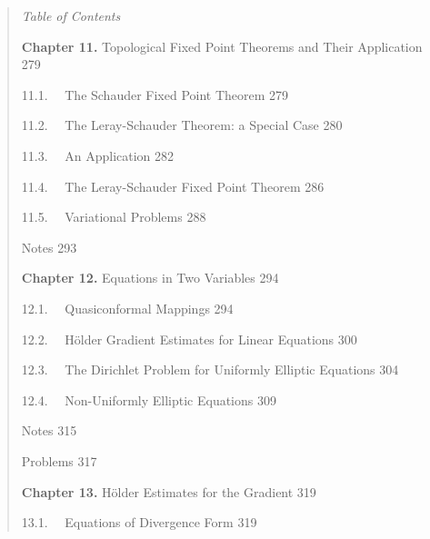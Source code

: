 \begin{quote}
\hfill \textit{Table of Contents}

\vspace{1em}

\noindent \textbf{Chapter 11.}  Topological Fixed Point Theorems and Their Application \hfill 279

\noindent \hspace*{1.5em} 11.1. \ \ The Schauder Fixed Point Theorem \hfill 279

\noindent \hspace*{1.5em} 11.2. \ \ The Leray-Schauder Theorem: a Special Case \hfill 280

\noindent \hspace*{1.5em} 11.3. \ \ An Application \hfill 282

\noindent \hspace*{1.5em} 11.4. \ \ The Leray-Schauder Fixed Point Theorem \hfill 286

\noindent \hspace*{1.5em} 11.5. \ \ Variational Problems \hfill 288

\noindent Notes \hfill 293

\vspace{1em}

\noindent \textbf{Chapter 12.}  Equations in Two Variables \hfill 294

\noindent \hspace*{1.5em} 12.1. \ \ Quasiconformal Mappings \hfill 294

\noindent \hspace*{1.5em} 12.2. \ \ Hölder Gradient Estimates for Linear Equations \hfill 300

\noindent \hspace*{1.5em} 12.3. \ \ The Dirichlet Problem for Uniformly Elliptic Equations \hfill 304

\noindent \hspace*{1.5em} 12.4. \ \ Non-Uniformly Elliptic Equations \hfill 309

\noindent Notes \hfill 315

\noindent Problems \hfill 317

\vspace{1em}

\noindent \textbf{Chapter 13.}  Hölder Estimates for the Gradient \hfill 319

\noindent \hspace*{1.5em} 13.1. \ \ Equations of Divergence Form \hfill 319


\end{quote}
